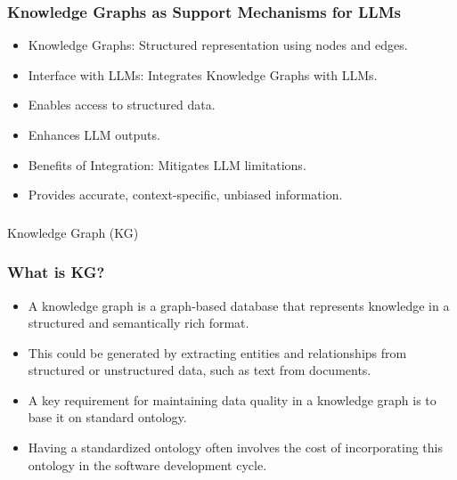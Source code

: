 \begin{frame}[fragile]\frametitle{Knowledge Graphs as Support Mechanisms for LLMs}

\begin{itemize}
\item Knowledge Graphs: Structured representation using nodes and edges.
\item Interface with LLMs: Integrates Knowledge Graphs with LLMs.
\item Enables access to structured data.
\item Enhances LLM outputs.
\item Benefits of Integration: Mitigates LLM limitations.
\item Provides accurate, context-specific, unbiased information.
\end{itemize}	

\end{frame}



\begin{frame}[fragile]\frametitle{}
\begin{center}
{\Large Knowledge Graph (KG)}

\end{center}
\end{frame}

\begin{frame}[fragile]\frametitle{What is KG?}

\begin{itemize}
\item A knowledge graph is a graph-based database that represents knowledge in a structured and semantically rich format. 
\item This could be generated by extracting entities and relationships from structured or unstructured data, such as text from documents. 
\item A key requirement for maintaining data quality in a knowledge graph is to base it on standard ontology. 
\item Having a standardized ontology often involves the cost of incorporating this ontology in the software development cycle.
\end{itemize}

\end{frame}



